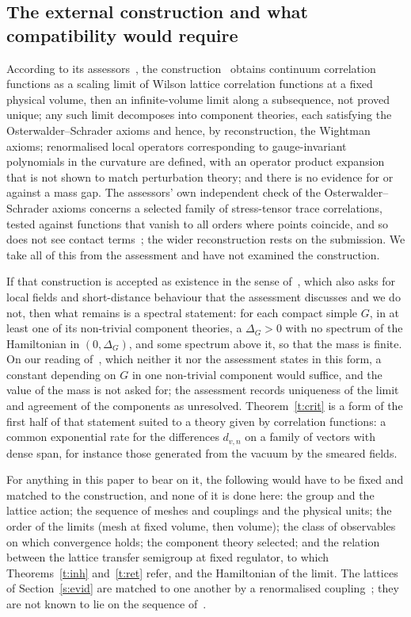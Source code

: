 \subsection{The external construction and what compatibility would require}\label{s:ext}
According to its assessors~\cite[pp.~1, 3]{YMG}, the construction~\cite{OAI} obtains continuum correlation
functions as a scaling limit of Wilson lattice correlation functions at a fixed physical volume, then an
infinite-volume limit along a subsequence, not proved unique; any such limit decomposes into component
theories, each satisfying the Osterwalder--Schrader axioms and hence, by reconstruction, the Wightman axioms;
renormalised local operators corresponding to gauge-invariant polynomials in the curvature are defined, with
an operator product expansion that is not shown to match perturbation theory; and there is no evidence for or
against a mass gap. The assessors' own independent check of the Osterwalder--Schrader axioms concerns a
selected family of stress-tensor trace correlations, tested against functions that vanish to all orders where
points coincide, and so does not see contact terms~\cite[Part~II]{YMG}; the wider reconstruction rests on
the submission. We take all of this from the assessment and have not examined the construction.

If that construction is accepted as existence in the sense of~\cite{JW}, which also asks for local fields and
short-distance behaviour that the assessment discusses and we do not, then what remains is a spectral
statement: for each compact simple $G$, in at least one of its non-trivial component theories, a $\Delta_G>0$
with no spectrum of the Hamiltonian in $(0,\Delta_G)$, and some spectrum above it, so that the mass is finite.
On our reading of~\cite{JW}, which neither it nor the assessment states in this form, a constant depending
on $G$ in one non-trivial component would suffice, and the value of the mass is not asked for; the
assessment records uniqueness of the limit and agreement of the components as unresolved. Theorem~\ref{t:crit} is a form of the first half of that statement suited to a
theory given by correlation functions: a common exponential rate for the differences $d_{v,n}$ on a family of
vectors with dense span, for instance those generated from the vacuum by the smeared fields.

For anything in this paper to bear on it, the following would have to be fixed and matched to the
construction, and none of it is done here: the group and the lattice action; the sequence of meshes and
couplings and the physical units; the order of the limits (mesh at fixed volume, then volume); the class of
observables on which convergence holds; the component theory selected; and the relation between the lattice
transfer semigroup at fixed regulator, to which Theorems~\ref{t:inh} and~\ref{t:ret} refer, and the
Hamiltonian of the limit. The lattices of Section~\ref{s:evid} are matched to one another by a renormalised
coupling~\cite{RepoData}; they are not known to lie on the sequence of~\cite{OAI}.

